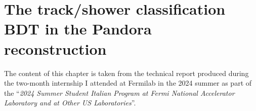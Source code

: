 \chapter{The track/shower classification BDT in the Pandora reconstruction}
\label{chap:mva_internship}

The content of this chapter is taken from the technical report produced during the two-month internship I attended at Fermilab in the 2024 summer as part of the ``\emph{2024 Summer Student Italian Program at Fermi National Accelerator Laboratory and at Other US Laboratories}''. 





